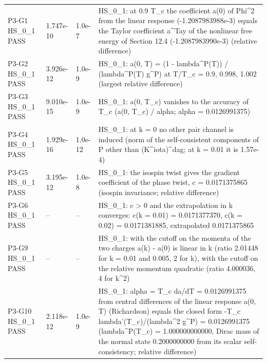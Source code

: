 \documentclass[aps,prd,onecolumn,superscriptaddress,nofootinbib,floatfix,longbibliography]{revtex4-2}
\begin{document}
\begin{longtable}{p{}p{}p{}p{}}
P3-G1 HS\_0\_1 \newline PASS & 1.747e-10 & 1.0e-7 & HS\_0\_1: at 0.9 T\_c the coefficient a(0) of \textbar{}Phi\textbar{}\textasciicircum{}2 from the linear response (-1.2087983988e-3) equals the Taylor coefficient a\textasciicircum{}Tay of the nonlinear free energy of Section 12.4 (-1.2087983990e-3) (relative difference) \\
P3-G2 HS\_0\_1 \newline PASS & 3.926e-12 & 1.0e-9 & HS\_0\_1: a(0, T) = (1 - lambda\textasciicircum{}P(T)) / (lambda\textasciicircum{}P(T) g\textasciicircum{}P) at T/T\_c = 0.9, 0.998, 1.002 (largest relative difference) \\
P3-G3 HS\_0\_1 \newline PASS & 9.010e-15 & 1.0e-9 & HS\_0\_1: a(0, T\_c) vanishes to the accuracy of T\_c (\textbar{}a(0, T\_c)\textbar{} / alpha; alpha = 0.0126991375) \\
P3-G4 HS\_0\_1 \newline PASS & 1.929e-16 & 1.0e-12 & HS\_0\_1: at k = 0 no other pair channel is induced (norm of the self-consistent components of P other than (K\textasciicircum{}iota)\textasciicircum{}dag; at k = 0.01 it is 1.57e-4) \\
P3-G5 HS\_0\_1 \newline PASS & 3.195e-12 & 1.0e-8 & HS\_0\_1: the isospin twist gives the gradient coefficient of the phase twist, c = 0.0171375865 (isospin invariance; relative difference) \\
P3-G6 HS\_0\_1 \newline PASS & -- & -- & HS\_0\_1: c \textgreater{} 0 and the extrapolation in k converges: c(k = 0.01) = 0.0171377370, c(k = 0.02) = 0.0171381885, extrapolated 0.0171375865 \\
P3-G9 HS\_0\_1 \newline PASS & -- & -- & HS\_0\_1: with the cutoff on the momenta of the two charges a(k) - a(0) is linear in \textbar{}k\textbar{} (ratio 2.01448 for k = 0.01 and 0.005, 2 for \textbar{}k\textbar{}), with the cutoff on the relative momentum quadratic (ratio 4.000036, 4 for k\textasciicircum{}2) \\
P3-G10 HS\_0\_1 \newline PASS & 2.118e-12 & 1.0e-9 & HS\_0\_1: alpha = T\_c da/dT = 0.0126991375 from central differences of the linear response a(0, T) (Richardson) equals the closed form -T\_c lambda'(T\_c)/(lambda\textasciicircum{}2 g\textasciicircum{}P) = 0.0126991375 (lambda\textasciicircum{}P(T\_c) = 1.000000000000, Dirac mass of the normal state 0.2000000000 from its scalar self-consistency; relative difference) \\

\end{longtable}
\end{document}
